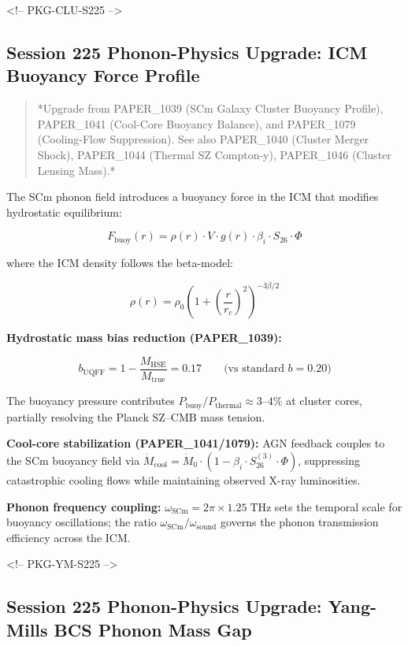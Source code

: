 \documentclass[11pt]{article}
\begin{document}
<!-- PKG-CLU-S225 -->

\subsection*{Session 225 Phonon-Physics Upgrade: ICM Buoyancy Force Profile}

\begin{quote}
*Upgrade from PAPER\_1039 (SCm Galaxy Cluster Buoyancy Profile),
PAPER\_1041 (Cool-Core Buoyancy Balance), and PAPER\_1079 (Cooling-Flow
Suppression).  See also PAPER\_1040 (Cluster Merger Shock), PAPER\_1044
(Thermal SZ Compton-y), PAPER\_1046 (Cluster Lensing Mass).*
\end{quote}

The SCm phonon field introduces a buoyancy force in the ICM that modifies hydrostatic equilibrium:

$$F_{\text{buoy}}(r) = \rho(r) \cdot V \cdot g(r) \cdot \beta_i \cdot S_{26} \cdot \Phi$$

where the ICM density follows the beta-model:

$$\rho(r) = \rho_0 \left(1 + \left(\frac{r}{r_c}\right)^2\right)^{-3\beta/2}$$

\textbf{Hydrostatic mass bias reduction (PAPER\_1039):}

$$b_{\text{UQFF}} = 1 - \frac{M_{\text{HSE}}}{M_{\text{true}}} = 0.17 \qquad \text{(vs standard } b = 0.20\text{)}$$

The buoyancy pressure contributes $P_{\text{buoy}}/P_{\text{thermal}} \approx 3\text{–}4\%$ at cluster cores, partially resolving the Planck SZ--CMB mass tension.

\textbf{Cool-core stabilization (PAPER\_1041/1079):} AGN feedback couples to the SCm buoyancy field via $\dot{M}_{\text{cool}} = \dot{M}_0 \cdot (1 - \beta_i \cdot S_{26}^{(3)} \cdot \Phi)$, suppressing catastrophic cooling flows while maintaining observed X-ray luminosities.

\textbf{Phonon frequency coupling:} $\omega_{\text{SCm}} = 2\pi \times 1.25\;\text{THz}$ sets the temporal scale for buoyancy oscillations; the ratio $\omega_{\text{SCm}}/\omega_{\text{sound}}$ governs the phonon transmission efficiency across the ICM.

<!-- PKG-YM-S225 -->

\subsection*{Session 225 Phonon-Physics Upgrade: Yang-Mills BCS Phonon Mass Gap}
\end{document}
